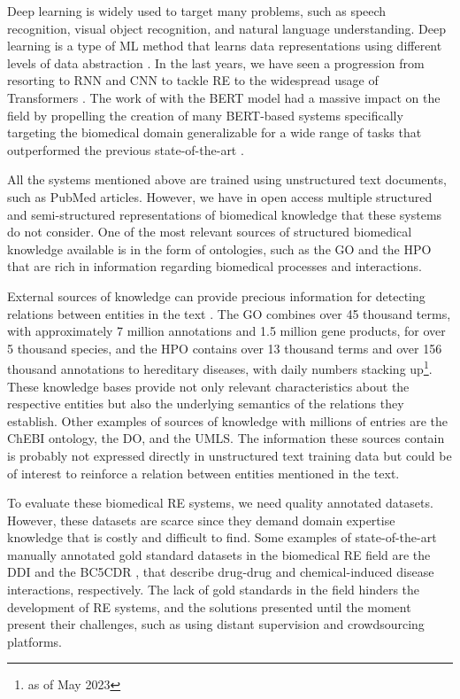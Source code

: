 Deep learning is widely used to target many problems, such as speech recognition, visual object recognition, and natural language understanding. Deep learning is a type of \ac{ML} method that learns data representations using different levels of data abstraction \citep{lecun2015deep}. In the last years, we have seen a progression from resorting to \ac{RNN} \citep{xu2018leveraging,lamurias2019bo} and \ac{CNN} \citep{jiang2016relation,lin2016neural} to tackle RE to the widespread usage of Transformers \citep{vaswani2017attention,devlin2019bert,brown2020language}. The work of \cite{devlin2019bert} with the BERT model had a massive impact on the field by propelling the creation of many BERT-based systems specifically targeting the biomedical domain generalizable for a wide range of tasks that outperformed the previous state-of-the-art  \citep{scibert,lee2020biobert,gu2021domain}.  

All the systems mentioned above are trained using unstructured text documents, such as PubMed articles. However, we have in open access multiple structured and semi-structured representations of biomedical knowledge that these systems do not consider. One of the most relevant sources of structured biomedical knowledge available is in the form of ontologies, such as the \ac{GO} \citep{ashburner2000gene, gene2019gene} and the \ac{HPO} \citep{robinson2010human} that are rich in information regarding biomedical processes and interactions. 

External sources of knowledge can provide precious information for detecting relations between entities in the text \citep{lamurias2019bo}. The GO combines over 45 thousand terms, with approximately 7 million annotations and 1.5 million gene products, for over 5 thousand species, and the HPO contains over 13 thousand terms and over 156 thousand annotations to hereditary diseases, with daily numbers stacking up\footnote{as of May 2023}. These knowledge bases provide not only relevant characteristics about the respective entities but also the underlying semantics of the relations they establish. Other examples of sources of knowledge with millions of entries are the \ac{ChEBI} ontology, the \ac{DO}, and the \ac{UMLS}. The information these sources contain is probably not expressed directly in unstructured text training data but could be of interest to reinforce a relation between entities mentioned in the text.

To evaluate these biomedical RE systems, we need quality annotated datasets. However, these datasets are scarce since they demand domain expertise knowledge that is costly and difficult to find. Some examples of state-of-the-art manually annotated gold standard datasets in the biomedical RE field are the \ac{DDI} \citep{herrero2013ddi} and the \ac{BC5CDR} \citep{inproceedingscdr}, that describe drug-drug and chemical-induced disease interactions, respectively. The lack of gold standards in the field hinders the development of RE systems, and the solutions presented until the moment present their challenges, such as using distant supervision and crowdsourcing platforms. 

